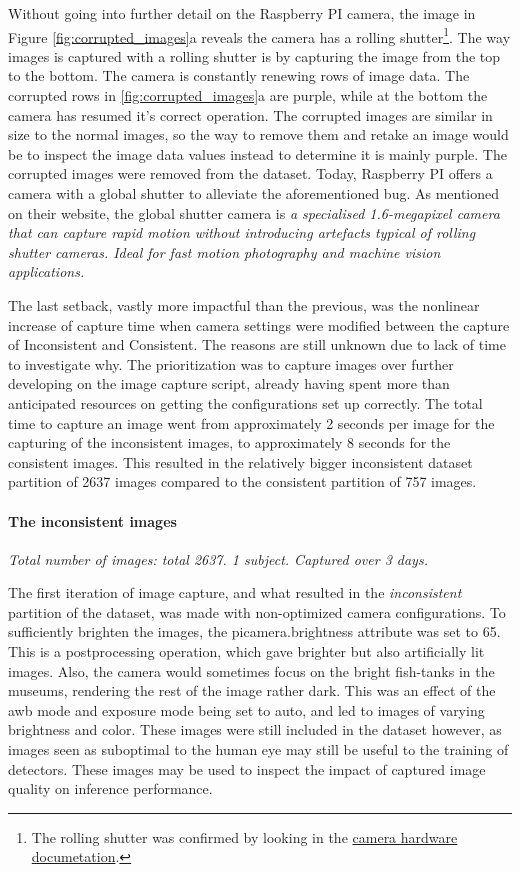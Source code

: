 Without going into further detail on the Raspberry PI camera, the image in Figure \ref{fig:corrupted_images}a reveals the camera has a rolling shutter\footnote{The rolling shutter was confirmed by looking in the \href{https://picamera.readthedocs.io/en/release-1.13/fov.html}{camera hardware documetation}.}. The way images is captured with a rolling shutter is by capturing the image from the top to the bottom. The camera is constantly renewing rows of image data. The corrupted rows in \ref{fig:corrupted_images}a are purple, while at the bottom the camera has resumed it's correct operation. The corrupted images are similar in size to the normal images, so the way to remove them and retake an image would be to inspect the image data values instead to determine it is mainly purple. The corrupted images were removed from the dataset. Today, Raspberry PI offers a camera with a global shutter to alleviate the aforementioned bug. As mentioned on their website, the global shutter camera is \textit{a specialised 1.6-megapixel camera that can capture rapid motion without introducing artefacts typical of rolling shutter cameras. Ideal for fast motion photography and machine vision applications.}

The last setback, vastly more impactful than the previous, was the nonlinear increase of capture time when camera settings were modified between the capture of Inconsistent and Consistent. The reasons are still unknown due to lack of time to investigate why. The prioritization was to capture images over further developing on the image capture script, already having spent more than anticipated resources on getting the configurations set up correctly. The total time to capture an image went from approximately 2 seconds per image for the capturing of the inconsistent images, to approximately 8 seconds for the consistent images. This resulted in the relatively bigger inconsistent dataset partition of 2637 images compared to the consistent partition of 757 images. 

\paragraph{The inconsistent images}
\textit{Total number of images: total 2637. 1 subject. Captured over 3 days.}

The first iteration of image capture, and what resulted in the \textit{inconsistent} partition of the dataset, was made with non-optimized camera configurations. To sufficiently brighten the images, the picamera.brightness attribute was set to 65. This is a postprocessing operation, which gave brighter but also artificially lit images. Also, the camera would sometimes focus on the bright fish-tanks in the museums, rendering the rest of the image rather dark. This was an effect of the awb mode and exposure mode being set to auto, and led to images of varying brightness and color. These images were still included in the dataset however, as images seen as suboptimal to the human eye may still be useful to the training of detectors. These images may be used to inspect the impact of captured image quality on inference performance.

